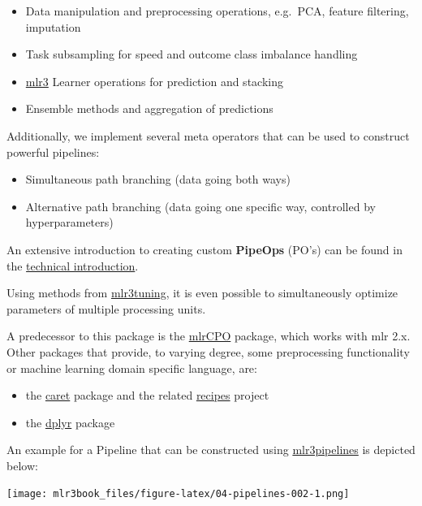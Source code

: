 \documentclass[]{article}
\providecommand{\tightlist}{%
  \setlength{\itemsep}{0pt}\setlength{\parskip}{0pt}}
\begin{document}
\begin{itemize}
\tightlist
\item
  Data manipulation and preprocessing operations, e.g.~PCA, feature filtering, imputation
\item
  Task subsampling for speed and outcome class imbalance handling
\item
  \href{https://mlr3.mlr-org.com}{mlr3} Learner operations for prediction and stacking
\item
  Ensemble methods and aggregation of predictions
\end{itemize}

Additionally, we implement several meta operators that can be used to construct powerful pipelines:

\begin{itemize}
\tightlist
\item
  Simultaneous path branching (data going both ways)
\item
  Alternative path branching (data going one specific way, controlled by hyperparameters)
\end{itemize}

An extensive introduction to creating custom \textbf{PipeOps} (PO's) can be found in the \protect\hyperlink{extending-mlr3pipelines}{technical introduction}.

Using methods from \href{https://mlr3tuning.mlr-org.com}{mlr3tuning}, it is even possible to simultaneously optimize parameters of multiple processing units.

A predecessor to this package is the \href{https://cran.r-project.org/package=mlrCPO}{mlrCPO} package, which works with mlr 2.x.
Other packages that provide, to varying degree, some preprocessing functionality or machine learning domain specific language, are:

\begin{itemize}
\tightlist
\item
  the \href{https://cran.r-project.org/package=caret}{caret} package and the related \href{https://cran.r-project.org/package=recipes}{recipes} project
\item
  the \href{https://cran.r-project.org/package=dplyr}{dplyr} package
\end{itemize}

An example for a Pipeline that can be constructed using \href{https://mlr3pipelines.mlr-org.com}{mlr3pipelines} is depicted below:

\texttt{[image: mlr3book\_files/figure-latex/04-pipelines-002-1.png]}
\end{document}
